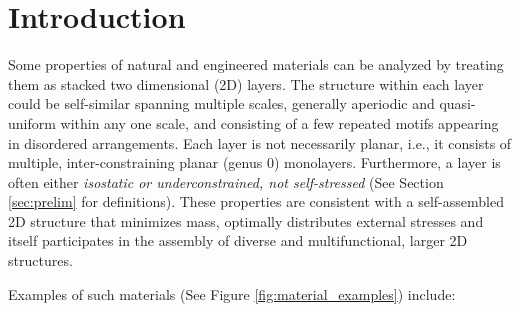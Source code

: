 \section{Introduction}
\label{sec:intro}

\newcommand{\meeraheader}[2]{\medskip\noindent\underbar{{\sl (#1) #2}}}

Some properties of natural and engineered materials can be analyzed by
treating them as stacked two dimensional (2D) layers. The structure
within each layer could be self-similar \cite{Intro1} spanning
multiple scales, generally aperiodic and quasi-uniform within any one
scale, and consisting of a few repeated motifs appearing in disordered
arrangements. Each layer is not necessarily planar, i.e., it consists
of multiple, inter-constraining planar (genus 0) monolayers.
Furthermore, a layer is often  either {\sl isostatic or
underconstrained, not self-stressed} (See Section \ref{sec:prelim} for
definitions). These properties are consistent with a self-assembled 2D
structure that minimizes mass, optimally distributes external stresses
and itself participates in the assembly of diverse and
multifunctional, larger 2D structures.

Examples of such materials (See Figure \ref{fig:material_examples})
include:

